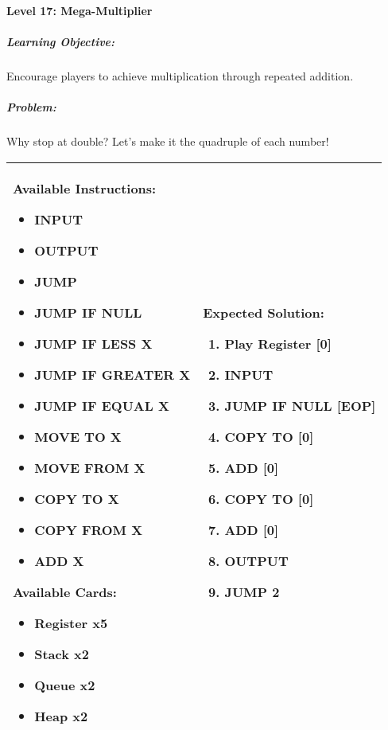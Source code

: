 \paragraph{Level 17: Mega-Multiplier}
\subparagraph{Learning Objective:} Encourage players to achieve multiplication through repeated addition.

\subparagraph{Problem:} Why stop at double? Let's make it the quadruple of each number!

\begin{center}
    \begin{tabular}{ | m{6cm} | m{8cm} | } 
        \hline
            \textbf{Available Instructions:} 
            \begin{itemize}
                \setlength\itemsep{-.35em}
                \item INPUT
                \item OUTPUT
                \item JUMP
                \item JUMP IF NULL
                \item JUMP IF LESS X
                \item JUMP IF GREATER X
		\item JUMP IF EQUAL X
                \item MOVE TO X
                \item MOVE FROM X
                \item COPY TO X
                \item COPY FROM X
		\item ADD X
            \end{itemize}
            \textbf{Available Cards:} 
            \begin{itemize}
                \setlength\itemsep{-.35em}
                \item Register x5
		\item Stack x2
                \item Queue x2
                \item Heap x2
            \end{itemize}& 
            \textbf{Expected Solution:} 
            \begin{enumerate}
                \setlength\itemsep{-.35em}
		\item Play Register [0]
                \item INPUT
		\item JUMP IF NULL [EOP]
		\item COPY TO [0]
		\item ADD [0]
		\item COPY TO [0]
		\item ADD [0]
		\item OUTPUT
		\item JUMP 2
            \end{enumerate}
            \\
        \hline
    \end{tabular}
\end{center}


